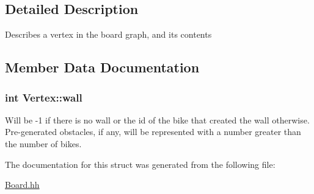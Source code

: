 \subsection{Detailed Description}
Describes a vertex in the board graph, and its contents 

\subsection{Member Data Documentation}
\subsubsection[{\texorpdfstring{wall}{wall}}]{\setlength{\rightskip}{0pt plus 5cm}int Vertex\+::wall}\hypertarget{structVertex_a06820e7fc724eb7e1a3f35df08be1cc6}{}\label{structVertex_a06820e7fc724eb7e1a3f35df08be1cc6}
Will be -\/1 if there is no wall or the id of the bike that created the wall otherwise. Pre-\/generated obstacles, if any, will be represented with a number greater than the number of bikes. 

The documentation for this struct was generated from the following file\+:\begin{DoxyCompactItemize}
\item 
\hyperlink{Board_8hh}{Board.\+hh}\end{DoxyCompactItemize}
